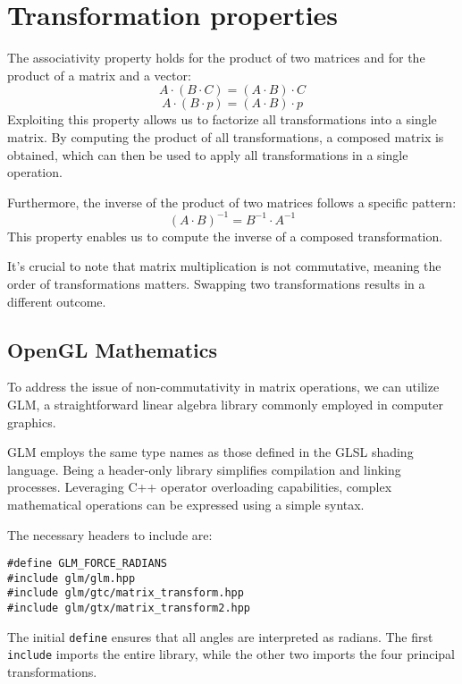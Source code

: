 \section{Transformation properties}

The associativity property holds for the product of two matrices and for the product of a matrix and a vector:
\[A \cdot \left(B \cdot C\right)=\left(A \cdot B\right) \cdot C\]
\[A \cdot \left(B \cdot p\right)=\left(A \cdot B\right) \cdot p\]
Exploiting this property allows us to factorize all transformations into a single matrix. 
By computing the product of all transformations, a composed matrix is obtained, which can then be used to apply all transformations in a single operation.

Furthermore, the inverse of the product of two matrices follows a specific pattern:
\[{\left( A \cdot B \right)}^{-1}=B^{-1}\cdot A^{-1}\]
This property enables us to compute the inverse of a composed transformation. 

It's crucial to note that matrix multiplication is not commutative, meaning the order of transformations matters. 
Swapping two transformations results in a different outcome.

\subsection{OpenGL Mathematics}
To address the issue of non-commutativity in matrix operations, we can utilize GLM, a straightforward linear algebra library commonly employed in computer graphics.

GLM employs the same type names as those defined in the GLSL shading language. 
Being a header-only library simplifies compilation and linking processes. 
Leveraging C++ operator overloading capabilities, complex mathematical operations can be expressed using a simple syntax.

The necessary headers to include are:
\begin{verbatim}
#define GLM_FORCE_RADIANS    
#include glm/glm.hpp
#include glm/gtc/matrix_transform.hpp
#include glm/gtx/matrix_transform2.hpp
\end{verbatim}
The initial \texttt{define} ensures that all angles are interpreted as radians. 
The first \texttt{include} imports the entire library, while the other two imports the four principal transformations.

